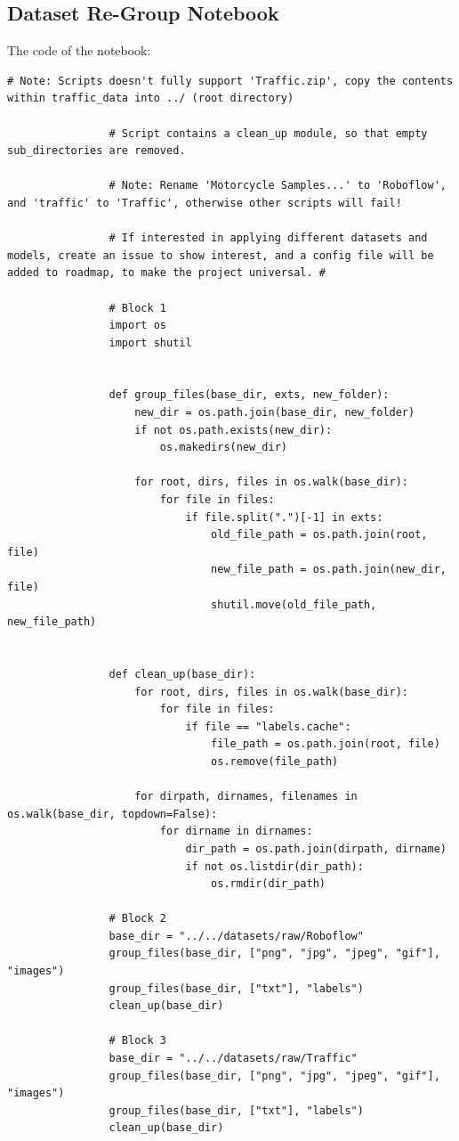 \documentclass[12pt]{report} %
\begin{document}
		\subsection*{Dataset Re-Group Notebook}
			The code of the notebook:
			\begin{lstlisting}[tabsize=1]
				# Note: Scripts doesn't fully support 'Traffic.zip', copy the contents within traffic_data into ../ (root directory)

				# Script contains a clean_up module, so that empty sub_directories are removed.

				# Note: Rename 'Motorcycle Samples...' to 'Roboflow', and 'traffic' to 'Traffic', otherwise other scripts will fail!

				# If interested in applying different datasets and models, create an issue to show interest, and a config file will be added to roadmap, to make the project universal. #

				# Block 1
				import os
				import shutil


				def group_files(base_dir, exts, new_folder):
					new_dir = os.path.join(base_dir, new_folder)
					if not os.path.exists(new_dir):
						os.makedirs(new_dir)

					for root, dirs, files in os.walk(base_dir):
						for file in files:
							if file.split(".")[-1] in exts:
								old_file_path = os.path.join(root, file)
								new_file_path = os.path.join(new_dir, file)
								shutil.move(old_file_path, new_file_path)


				def clean_up(base_dir):
					for root, dirs, files in os.walk(base_dir):
						for file in files:
							if file == "labels.cache":
								file_path = os.path.join(root, file)
								os.remove(file_path)

					for dirpath, dirnames, filenames in os.walk(base_dir, topdown=False):
						for dirname in dirnames:
							dir_path = os.path.join(dirpath, dirname)
							if not os.listdir(dir_path):
								os.rmdir(dir_path)

				# Block 2
				base_dir = "../../datasets/raw/Roboflow"
				group_files(base_dir, ["png", "jpg", "jpeg", "gif"], "images")
				group_files(base_dir, ["txt"], "labels")
				clean_up(base_dir)

				# Block 3
				base_dir = "../../datasets/raw/Traffic"
				group_files(base_dir, ["png", "jpg", "jpeg", "gif"], "images")
				group_files(base_dir, ["txt"], "labels")
				clean_up(base_dir)
			\end{lstlisting}
\end{document}
